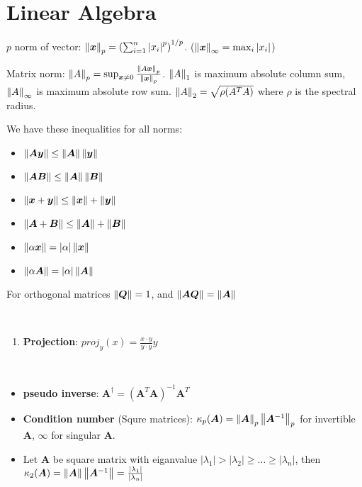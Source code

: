 \documentclass[12pt]{article}
\begin{document}
\section{Linear Algebra}

\begin{definition}[Norm]
	$p$ norm of vector: $\left\lVert\bm{x}\right\rVert_p = \left(\sum_{i=1}^{n} \left|x_i\right|^p\right)^{1/p}$. ($\left\lVert\bm{x}\right\rVert_\infty = \max_i \left|x_i\right|$)

	Matrix norm: $\left\lVert A\right\rVert_p = \sup_{\bm{x} \neq 0} \frac{\left\lVert A\bm{x}\right\rVert_p}{\left\lVert\bm{x}\right\rVert_p}$.
	$\left\lVert A\right\rVert_1$ is maximum absolute column sum, $\left\lVert A\right\rVert_\infty$ is maximum absolute row sum.
	$\left\lVert A\right\rVert_2 = \sqrt{\rho(A^TA)}$ where $\rho$ is the spectral radius.

	We have these inequalities for all norms:
	\begin{itemize}
		\item $\left\lVert\bm{A}\bm{y}\right\rVert \leq \left\lVert\bm{A}\right\rVert \left\lVert\bm{y}\right\rVert$
		\item $\left\lVert\bm{A}\bm{B}\right\rVert \leq \left\lVert\bm{A}\right\rVert \left\lVert\bm{B}\right\rVert$
		\item $\left\lVert\bm{x} + \bm{y}\right\rVert \leq \left\lVert\bm{x}\right\rVert + \left\lVert\bm{y}\right\rVert$
		\item $\left\lVert\bm{A} + \bm{B}\right\rVert \leq \left\lVert\bm{A}\right\rVert + \left\lVert\bm{B}\right\rVert$
		\item $\left\lVert\alpha \bm{x}\right\rVert = |\alpha| \left\lVert\bm{x}\right\rVert$
		\item $\left\lVert\alpha \bm{A}\right\rVert = |\alpha| \left\lVert\bm{A}\right\rVert$
	\end{itemize}

	For orthogonal matrices $\left\lVert\bm{Q}\right\rVert = 1$, and $\left\lVert\bm{A}\bm{Q}\right\rVert = \left\lVert\bm{A}\right\rVert$
\end{definition}

\begin{theorem}[vectors]
	\ 

	\begin{enumerate}
		\item \textbf{Projection}: $proj_{y} (x) = \frac{x \cdot y} {y \cdot y} y$
	\end{enumerate}
\end{theorem}

\begin{theorem}[Matices] 
	\ 
	\begin{itemize}
		\item \textbf{pseudo inverse}: $\bm{A}^{\dag} = (\bm{A}^T\bm{A})^{-1} \bm{A}^T$ 
		\item \textbf{Condition number} (Squre matrices): $\kappa_p(\bm{A}) = \left\lVert\bm{A}\right\rVert_p \left\lVert\bm{A}^{-1}\right\rVert_p$ for invertible $\bm{A}$, $\infty$ for singular $\bm{A}$.
		\item Let $\bm{A}$ be square matrix with eiganvalue $|\lambda_1| > |\lambda_2| \geq \dots \geq |\lambda_n|$, then $\kappa_2(\bm{A}) = \left\lVert\bm{A}\right\rVert \left\lVert\bm{A}^{-1}\right\rVert = \frac{|\lambda_1|}{|\lambda_n|}$

	\end{itemize}
\end{theorem}
\end{document}
